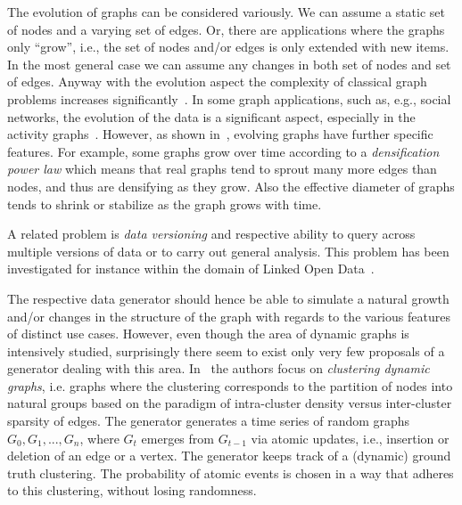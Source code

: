 The evolution of graphs can be considered variously. We can assume a static set of nodes and a varying set of edges.  Or, there are applications where the graphs only ``grow'', i.e., the set of nodes and/or edges is only extended with new items. In the most general case we can assume any changes in both set of nodes and set of edges. Anyway with the evolution aspect the complexity of classical graph problems increases significantly~\cite{Michail2015,Wu:2014:PPT:2732939.2732945}. In some graph applications, such as, e.g., social networks, the evolution of the
data is a significant aspect, especially in the activity graphs~\cite{doreian1997evolution,Kumar:2006:SEO:1150402.1150476,Hellmann2014583,wang2013,Kossinets88,Viswanath:2009:EUI:1592665.1592675}.
However, as shown in~\cite{Leskovec:2005:RMT:2101235.2101254,Leskovec:2005:GOT:1081870.1081893},
evolving graphs have further specific features. For example, some graphs grow over time according to a \emph{densification power law} which means that real graphs tend to sprout many more edges than nodes, and thus are densifying as they grow. Also the effective diameter of graphs tends to shrink or stabilize as the graph grows with time.

A related problem is \emph{data versioning} and respective ability to query across multiple versions of data or to carry out general analysis.
This problem has been investigated for instance within the domain of Linked
Open Data~\cite{DBLP:conf/semweb/Papakonstantinou16,DBLP:conf/esws/MeimarisP16,fernandez2015towards,fernandez2015bear}.


The respective data generator should hence be able to simulate a natural growth and/or changes in the structure of the graph with regards to the various features of distinct use cases. However,  even though the area of dynamic graphs is intensively studied, surprisingly there seem to exist only very few proposals of a generator dealing with this area. In~\cite{GoerkeKlugeSchumm2012_1000029825} the authors focus on \emph{clustering dynamic graphs}, i.e. graphs where the clustering corresponds to the partition of nodes into natural groups based on the paradigm of intra-cluster density versus inter-cluster sparsity of edges. The generator generates a time series of random graphs $G_0, G_1, ..., G_n$, where $G_t$ emerges from $G_{t-1}$ via atomic updates, i.e., insertion or deletion of an edge or a vertex. The generator keeps track of a (dynamic) ground truth clustering. The probability of atomic events is chosen in a way that adheres to this clustering, without losing randomness.

